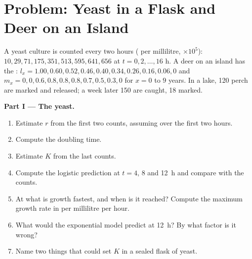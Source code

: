 \section{Problem: Yeast in a Flask and Deer on an Island}

\begin{problem}
\label{pb:b1:populations:1}
A yeast culture is counted every two hours ( per millilitre,
$\times 10^5$): $10, 29, 71, 175, 351, 513, 595, 641, 656$ at $t = 0,
2, \ldots, 16$ h. A deer  on an island has the :
$l_x = 1.00, 0.60, 0.52, 0.46, 0.40, 0.34, 0.26, 0.16, 0.06, 0$ and
$m_x = 0, 0, 0.6, 0.8, 0.8, 0.8, 0.7, 0.5, 0.3, 0$ for $x = 0$ to $9$
years. In a lake, 120 perch are marked and released; a week later 150
are caught, 18 marked.

\medskip
\noindent\textbf{Part I --- The yeast.}
\begin{enumerate}
  \item Estimate $r$ from the first two counts, assuming  over the first two hours.
  \item Compute the doubling time.
  \item Estimate $K$ from the last counts.
  \item Compute the logistic prediction at $t = 4$, $8$ and \qty{12}{h}
        and compare with the counts.
  \item At what  is growth fastest, and when is it reached?
        Compute the maximum growth rate in  per millilitre per
        hour.
  \item What would the exponential model predict at \qty{12}{h}? By
        what factor is it wrong?
  \item Name two things that could set $K$ in a sealed flask of
        yeast.
\end{enumerate}


\end{problem}

